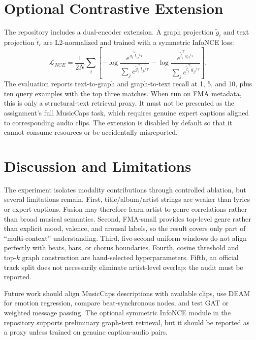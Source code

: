 \IfFileExists{IEEEtran.cls}{\usingieeetrue\documentclass[conference]{IEEEtran}}{\usingieeefalse\documentclass[10pt,twocolumn]{article}}
\begin{document}
\section{Optional Contrastive Extension}
The repository includes a dual-encoder extension. A graph projection $\tilde{g}_i$ and text projection $\tilde{t}_i$ are L2-normalized and trained with a symmetric InfoNCE loss:
\begin{equation}
\mathcal{L}_{NCE}=\frac{1}{2N}\sum_i\left[-\log\frac{e^{\tilde{g}_i^\top\tilde{t}_i/\tau}}{\sum_j e^{\tilde{g}_i^\top\tilde{t}_j/\tau}}-\log\frac{e^{\tilde{t}_i^\top\tilde{g}_i/\tau}}{\sum_j e^{\tilde{t}_i^\top\tilde{g}_j/\tau}}\right].
\end{equation}
The evaluation reports text-to-graph and graph-to-text recall at 1, 5, and 10, plus ten query examples with the top three matches. When run on FMA metadata, this is only a structural-text retrieval proxy. It must not be presented as the assignment's full MusicCaps task, which requires genuine expert captions aligned to corresponding audio clips. The extension is disabled by default so that it cannot consume resources or be accidentally misreported.

\section{Discussion and Limitations}
The experiment isolates modality contributions through controlled ablation, but several limitations remain. First, title/album/artist strings are weaker than lyrics or expert captions. Fusion may therefore learn artist-to-genre correlations rather than broad musical semantics. Second, FMA-small provides top-level genre rather than explicit mood, valence, and arousal labels, so the result covers only part of ``multi-context'' understanding. Third, five-second uniform windows do not align perfectly with beats, bars, or chorus boundaries. Fourth, cosine threshold and top-$k$ graph construction are hand-selected hyperparameters. Fifth, an official track split does not necessarily eliminate artist-level overlap; the audit must be reported.

Future work should align MusicCaps descriptions with available clips, use DEAM for emotion regression, compare beat-synchronous nodes, and test GAT or weighted message passing. The optional symmetric InfoNCE module in the repository supports preliminary graph-text retrieval, but it should be reported as a proxy unless trained on genuine caption-audio pairs.
\end{document}
